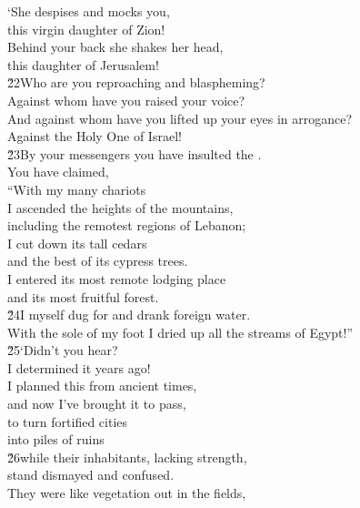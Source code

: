 \begin{poetry}
\poeml `She despises and mocks you, \\
\poemll    this virgin daughter of Zion! \\
\poeml Behind your back she shakes her head, \\
\poemll    this daughter of Jerusalem! \\
\poeml \v{22}Who are you reproaching and blaspheming? \\
\poemll    Against whom have you raised your voice? \\
\poeml And against whom have you lifted up your eyes in arrogance? \\
\poemll    Against the Holy One of Israel! \\
\poeml \v{23}By your messengers you have insulted the . \\
\poemll    You have claimed, \\
\poeml ``With my many chariots \\
\poemll    I ascended the heights of the mountains, \\
\poemlll       including the remotest regions of Lebanon; \\
\poeml I cut down its tall cedars \\
\poemll    and the best of its cypress trees. \\
\poeml I entered its most remote lodging place \\
\poemll    and its most fruitful forest. \\
\poeml \v{24}I myself dug for and drank foreign water. \\
\poemll    With the sole of my foot I dried up all the streams of Egypt!'' \\
\poeml \v{25}`Didn't you hear? \\
\poemll    I determined it years ago! \\
\poeml I planned this from ancient times, \\
\poemll    and now I've brought it to pass, \\
\poeml to turn fortified cities \\
\poemll    into piles of ruins \\
\poeml \v{26}while their inhabitants, lacking strength, \\
\poemll    stand dismayed and confused. \\
\poeml They were like vegetation out in the fields, \\

\end{poetry}
